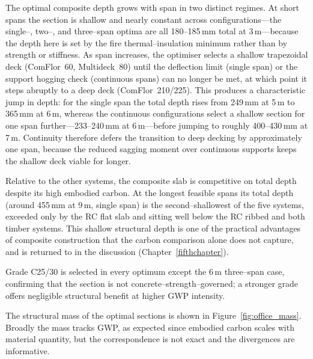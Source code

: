 The optimal composite depth grows with span in two distinct regimes. At short spans the section is shallow and nearly constant across configurations---the single--, two--, and three--span optima are all 180--185\,mm total at 3\,m---because the depth here is set by the fire thermal--insulation minimum rather than by strength or stiffness. As span increases, the optimiser selects a shallow trapezoidal deck (ComFlor~60, Multideck~80) until the deflection limit (single span) or the support hogging check (continuous spans) can no longer be met, at which point it steps abruptly to a deep deck (ComFlor~210/225). This produces a characteristic jump in depth: for the single span the total depth rises from 249\,mm at 5\,m to 365\,mm at 6\,m, whereas the continuous configurations select a shallow section for one span further---233--240\,mm at 6\,m---before jumping to roughly 400--430\,mm at 7\,m. Continuity therefore defers the transition to deep decking by approximately one span, because the reduced sagging moment over continuous supports keeps the shallow deck viable for longer.

Relative to the other systems, the composite slab is competitive on total depth despite its high embodied carbon. At the longest feasible spans its total depth (around 455\,mm at 9\,m, single span) is the second--shallowest of the five systems, exceeded only by the RC flat slab and sitting well below the RC ribbed and both timber systems. This shallow structural depth is one of the practical advantages of composite construction that the carbon comparison alone does not capture, and is returned to in the discussion (Chapter~\ref{fifthchapter}).

Grade C25/30 is selected in every optimum except the 6\,m three--span case, confirming that the section is not concrete--strength--governed; a stronger grade offers negligible structural benefit at higher GWP intensity.

The structural mass of the optimal sections is shown in Figure~\ref{fig:office_mass}. Broadly the mass tracks GWP, as expected since embodied carbon scales with material quantity, but the correspondence is not exact and the divergences are informative.
 
